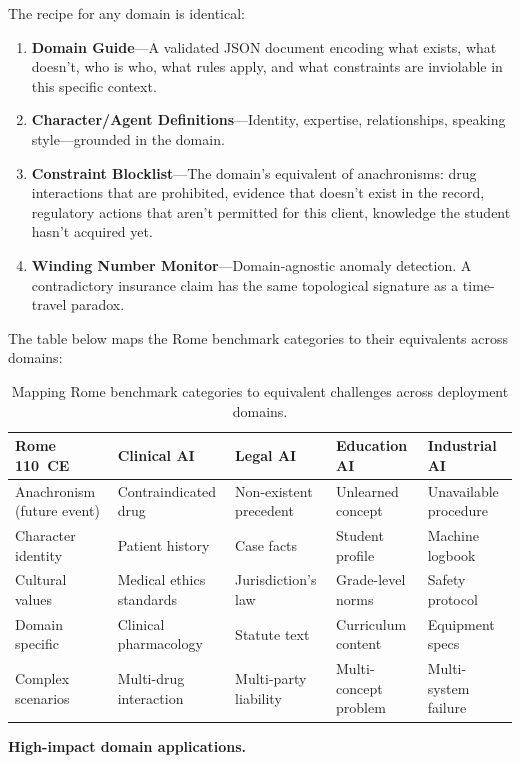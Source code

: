\documentclass[11pt,a4paper]{article}
\begin{document}
The recipe for any domain is identical:
\begin{enumerate}
  \item \textbf{Domain Guide}---A validated JSON document encoding what
        exists, what doesn't, who is who, what rules apply, and what
        constraints are inviolable in this specific context.
  \item \textbf{Character/Agent Definitions}---Identity, expertise,
        relationships, speaking style---grounded in the domain.
  \item \textbf{Constraint Blocklist}---The domain's equivalent of
        anachronisms: drug interactions that are prohibited, evidence that
        doesn't exist in the record, regulatory actions that aren't permitted
        for this client, knowledge the student hasn't acquired yet.
  \item \textbf{Winding Number Monitor}---Domain-agnostic anomaly detection.
        A contradictory insurance claim has the same topological signature as
        a time-travel paradox.
\end{enumerate}

The table below maps the Rome benchmark categories to their equivalents
across domains:

\begin{table}[h]
\centering
\small
\begin{tabular}{p{2.5cm}p{2.3cm}p{2.2cm}p{2.2cm}p{2.3cm}}
\toprule
Rome 110~CE & Clinical AI & Legal AI & Education AI & Industrial AI \\
\midrule
Anachronism (future event) & Contraindicated drug & Non-existent precedent & Unlearned concept & Unavailable procedure \\[4pt]
Character identity & Patient history & Case facts & Student profile & Machine logbook \\[4pt]
Cultural values & Medical ethics standards & Jurisdiction's law & Grade-level norms & Safety protocol \\[4pt]
Domain specific & Clinical pharmacology & Statute text & Curriculum content & Equipment specs \\[4pt]
Complex scenarios & Multi-drug interaction & Multi-party liability & Multi-concept problem & Multi-system failure \\
\bottomrule
\end{tabular}
\caption{Mapping Rome benchmark categories to equivalent challenges across
deployment domains.}
\end{table}

\textbf{High-impact domain applications.}
\end{document}
